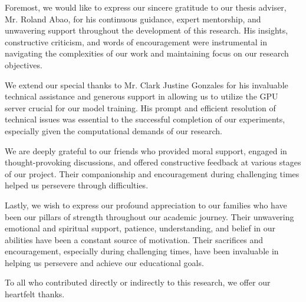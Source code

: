 \begin{acknowledgment}

  Foremost, we would like to express our sincere gratitude to our thesis adviser, Mr. Roland Abao, for his continuous guidance, expert mentorship, and unwavering support throughout the development of this research. His insights, constructive criticism, and words of encouragement were instrumental in navigating the complexities of our work and maintaining focus on our research objectives.

  We extend our special thanks to Mr. Clark Justine Gonzales for his invaluable technical assistance and generous support in allowing us to utilize the GPU server crucial for our model training. His prompt and efficient resolution of technical issues was essential to the successful completion of our experiments, especially given the computational demands of our research.

  We are deeply grateful to our friends who provided moral support, engaged in thought-provoking discussions, and offered constructive feedback at various stages of our project. Their companionship and encouragement during challenging times helped us persevere through difficulties.

  Lastly, we wish to express our profound appreciation to our families who have been our pillars of strength throughout our academic journey. Their unwavering emotional and spiritual support, patience, understanding, and belief in our abilities have been a constant source of motivation. Their sacrifices and encouragement, especially during challenging times, have been invaluable in helping us persevere and achieve our educational goals.

  To all who contributed directly or indirectly to this research, we offer our heartfelt thanks.

\end{acknowledgment}

